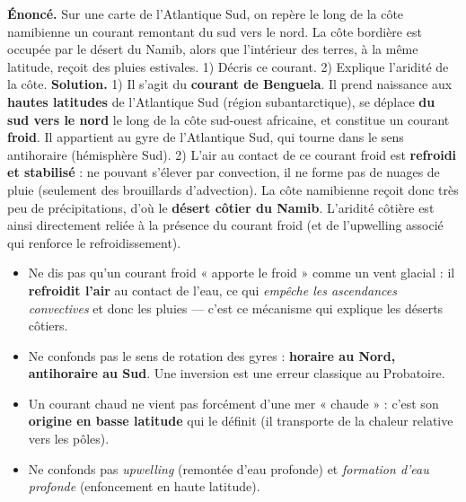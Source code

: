 \documentclass[11pt]{article}
\begin{document}
\begin{exoresolu}
\textbf{Énoncé.} Sur une carte de l'Atlantique Sud, on repère le long de la côte namibienne un courant remontant du sud vers le nord. La côte bordière est occupée par le désert du Namib, alors que l'intérieur des terres, à la même latitude, reçoit des pluies estivales. 1) Décris ce courant. 2) Explique l'aridité de la côte.
\tcblower
\textbf{Solution.} 1) Il s'agit du \textbf{courant de Benguela}. Il prend naissance aux \textbf{hautes latitudes} de l'Atlantique Sud (région subantarctique), se déplace \textbf{du sud vers le nord} le long de la côte sud-ouest africaine, et constitue un courant \textbf{froid}. Il appartient au gyre de l'Atlantique Sud, qui tourne dans le sens antihoraire (hémisphère Sud).
2) L'air au contact de ce courant froid est \textbf{refroidi et stabilisé} : ne pouvant s'élever par convection, il ne forme pas de nuages de pluie (seulement des brouillards d'advection). La côte namibienne reçoit donc très peu de précipitations, d'où le \textbf{désert côtier du Namib}. L'aridité côtière est ainsi directement reliée à la présence du courant froid (et de l'upwelling associé qui renforce le refroidissement).
\end{exoresolu}

\begin{attention}
\begin{itemize}
\item Ne dis pas qu'un courant froid « apporte le froid » comme un vent glacial : il \textbf{refroidit l'air} au contact de l'eau, ce qui \emph{empêche les ascendances convectives} et donc les pluies — c'est ce mécanisme qui explique les déserts côtiers.
\item Ne confonds pas le sens de rotation des gyres : \textbf{horaire au Nord, antihoraire au Sud}. Une inversion est une erreur classique au Probatoire.
\item Un courant chaud ne vient pas forcément d'une mer « chaude » : c'est son \textbf{origine en basse latitude} qui le définit (il transporte de la chaleur relative vers les pôles).
\item Ne confonds pas \emph{upwelling} (remontée d'eau profonde) et \emph{formation d'eau profonde} (enfoncement en haute latitude).
\end{itemize}
\end{attention}
\end{document}
